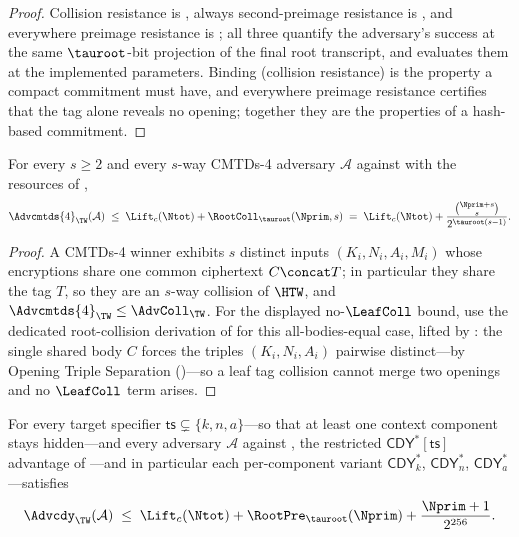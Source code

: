 \begin{proof}
Collision resistance is , always second-preimage
resistance is , and everywhere preimage resistance is
; all three quantify
the adversary's success at the same $\tauroot$-bit projection of the final
root transcript, and  evaluates them at the
implemented parameters. Binding (collision resistance) is the property a
compact commitment must have, and everywhere preimage resistance certifies
that the tag alone reveals no opening; together they are the properties of
a hash-based commitment.
\end{proof}

\begin{corollary}
\label{cor:cmtds4}
For every $s \geq 2$ and every $s$-way CMTDs-4
adversary $\mathcal{A}$ against \TW{} with the resources of
,
\[
  \Advcmtds{4}_\TW(\mathcal{A})
  \;\leq\;
  \Lift_c(\Ntot) + \RootColl_{\tauroot}(\Nprim, s)
  \;=\;
  \Lift_c(\Ntot) + \frac{\binom{\Nprim + s}{s}}{2^{\tauroot (s - 1)}}.
\]
\end{corollary}

\begin{proof}
A CMTDs-4 winner exhibits $s$ distinct inputs $(K_i,N_i,A_i,M_i)$ whose
encryptions share one common ciphertext $C \concat T$; in particular they
share the tag $T$, so they are an $s$-way collision of $\HTW$, and
$\Advcmtds{4}_\TW \leq \AdvColl_\TW$. For the displayed no-$\LeafColl$
bound, use the dedicated root-collision derivation of 
for this all-bodies-equal case, lifted by : the
single shared body $C$ forces the triples $(K_i,N_i,A_i)$ pairwise
distinct---by Opening Triple Separation ()---so a
leaf tag collision cannot merge two openings and no $\LeafColl$ term
arises.
\end{proof}

\begin{theorem}
\label{thm:cdy-full}
For every target specifier $\mathsf{ts} \subsetneq \{k, n, a\}$---so that
at least one context component stays hidden---and every adversary
$\mathcal{A}$ against \TW{}, the restricted $\mathsf{CDY}^\ast[\mathsf{ts}]$
advantage
of \cite[Fig.~5]{MLGR23}---and in particular each per-component variant
$\mathsf{CDY}^\ast_k$, $\mathsf{CDY}^\ast_n$, $\mathsf{CDY}^\ast_a$---satisfies
\[
  \Advcdy_\TW(\mathcal{A})
  \;\leq\;
  \Lift_c(\Ntot) + \RootPre_{\tauroot}(\Nprim) + \frac{\Nprim+1}{2^{256}}.
\]
\end{theorem}


